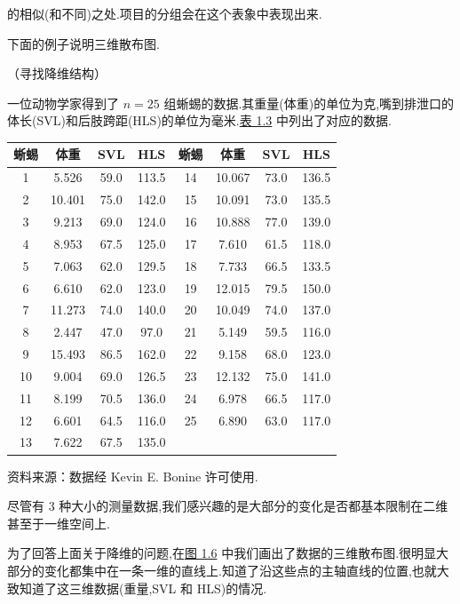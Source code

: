 
的相似(和不同)之处.项目的分组会在这个表象中表现出来.

下面的例子说明三维散布图.

\quad （寻找降维结构）

一位动物学家得到了 $n=25$ 组蜥蜴的数据.其重量(体重)的单位为克,嘴到排泄口的体长(SVL)和后肢跨距(HLS)的单位为毫米.\hyperref[tab:1.3]{表 1.3} 中列出了对应的数据.

\begin{mvtable}
\begin{tabular}{cccc|cccc}
\toprule
蜥蜴 & 体重 & SVL & HLS & 蜥蜴 & 体重 & SVL & HLS \\
\midrule
1 & 5.526 & 59.0 & 113.5 & 14 & 10.067 & 73.0 & 136.5 \\
2 & 10.401 & 75.0 & 142.0 & 15 & 10.091 & 73.0 & 135.5 \\
3 & 9.213 & 69.0 & 124.0 & 16 & 10.888 & 77.0 & 139.0 \\
4 & 8.953 & 67.5 & 125.0 & 17 & 7.610 & 61.5 & 118.0 \\
5 & 7.063 & 62.0 & 129.5 & 18 & 7.733 & 66.5 & 133.5 \\
6 & 6.610 & 62.0 & 123.0 & 19 & 12.015 & 79.5 & 150.0 \\
7 & 11.273 & 74.0 & 140.0 & 20 & 10.049 & 74.0 & 137.0 \\
8 & 2.447 & 47.0 & 97.0 & 21 & 5.149 & 59.5 & 116.0 \\
9 & 15.493 & 86.5 & 162.0 & 22 & 9.158 & 68.0 & 123.0 \\
10 & 9.004 & 69.0 & 126.5 & 23 & 12.132 & 75.0 & 141.0 \\
11 & 8.199 & 70.5 & 136.0 & 24 & 6.978 & 66.5 & 117.0 \\
12 & 6.601 & 64.5 & 116.0 & 25 & 6.890 & 63.0 & 117.0 \\
13 & 7.622 & 67.5 & 135.0 & & & & \\
\bottomrule
\end{tabular}
\label{tab:1.3}
\end{mvtable}

{ 资料来源：数据经 Kevin E. Bonine 许可使用.}

尽管有 3 种大小的测量数据,我们感兴趣的是大部分的变化是否都基本限制在二维甚至于一维空间上.

为了回答上面关于降维的问题,在\hyperref[fig:1.6]{图 1.6} 中我们画出了数据的三维散布图.很明显大部分的变化都集中在一条一维的直线上.知道了沿这些点的主轴直线的位置,也就大致知道了这三维数据(重量,SVL 和 HLS)的情况.


